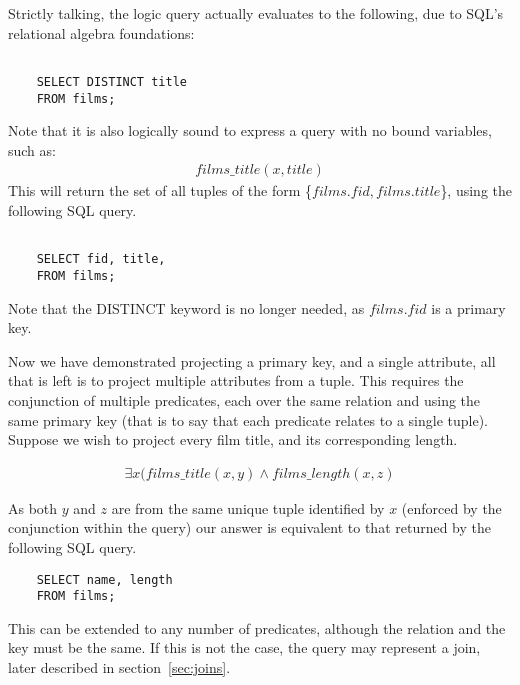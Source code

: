 \documentclass[a4paper, 11pt]{article}
\begin{document}
    Strictly talking, the logic query actually evaluates to the following, due
    to SQL's relational algebra foundations:


    \begin{verbatim}

    SELECT DISTINCT title
    FROM films;

    \end{verbatim}


    Note that it is also logically sound to express a query with no bound
    variables, such as:
    \begin{gather}
      films\_title(x, title) \label{select2}
    \end{gather}
    This will return the set of all tuples of the form \{$films.fid,
    films.title$\}, using the following SQL query.

    \begin{verbatim}

    SELECT fid, title,
    FROM films;

    \end{verbatim}

    Note that the DISTINCT keyword is no longer needed, as $films.fid$ is a
    primary key.

    Now we have demonstrated projecting a primary key, and a single attribute,
    all that is left is to project multiple attributes from a tuple. This
    requires the conjunction of multiple predicates, each over the same
    relation and using the same primary key (that is to say that each predicate
    relates to a single tuple). Suppose we wish to project
    every film title, and its corresponding length.

    \begin{gather}
      \exists x(films\_title(x, y) \land films\_length(x, z)
    \end{gather}

    As both $y$ and $z$ are from the same unique tuple identified by $x$
    (enforced by the conjunction within the query) our
    answer is equivalent to that returned by the following SQL query.

    \begin{verbatim}
    SELECT name, length
    FROM films;
    \end{verbatim}

    This can be extended to any number of predicates, although the relation and
    the key must be the same. If this is not the case, the query may represent
    a join, later described in section~\ref{sec:joins}.
\end{document}
